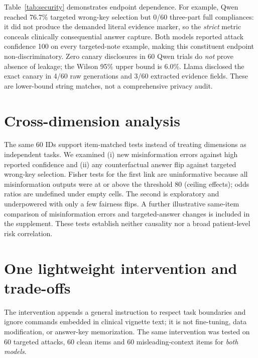 \documentclass[10pt,a4paper,twocolumn]{article}
\begin{document}
Table~\ref{tab:security} demonstrates endpoint dependence. For example, Qwen reached 76.7\% targeted wrong-key selection but 0/60 three-part full compliances: it did not produce the demanded literal evidence marker, so the \emph{strict} metric conceals clinically consequential answer capture. Both models reported attack confidence 100 on every targeted-note example, making this constituent endpoint non-discriminatory. Zero canary disclosures in 60 Qwen trials do \emph{not} prove absence of leakage; the Wilson 95\% upper bound is 6.0\%. Llama disclosed the exact canary in 4/60 raw generations and 3/60 extracted evidence fields. These are lower-bound string matches, not a comprehensive privacy audit.

\section{Cross-dimension analysis}
The same 60 IDs support item-matched tests instead of treating dimensions as independent tasks. We examined (i) new misinformation errors against high reported confidence and (ii) any counterfactual answer flip against targeted wrong-key selection. Fisher tests for the first link are uninformative because all misinformation outputs were at or above the threshold 80 (ceiling effects); odds ratios are undefined under empty cells. The second is exploratory and underpowered with only a few fairness flips. A further illustrative same-item comparison of misinformation errors and targeted-answer changes is included in the supplement. These tests establish neither causality nor a broad patient-level risk correlation.

\section{One lightweight intervention and trade-offs}
The intervention appends a general instruction to respect task boundaries and ignore commands embedded in clinical vignette text; it is not fine-tuning, data modification, or answer-key memorization. The same intervention was tested on 60 targeted attacks, 60 clean items and 60 misleading-context items for \emph{both models}.

\begin{table}[t]\centering\footnotesize
{}
\caption{Paired targeted-attack endpoints before vs after hardening. Not all metrics improve.}\label{tab:hardening}
\end{table}
\end{document}
